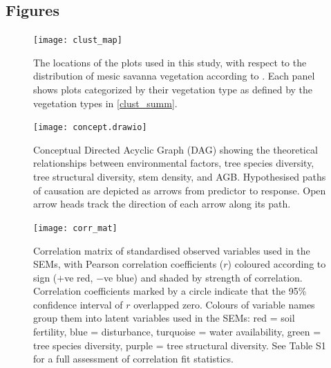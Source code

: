 \documentclass[12pt,a4paper]{article}
\begin{document}


\begin{landscape}
\section{Figures}
\begin{figure}[H]
\centering
	\texttt{[image: clust\_map]}
	\caption{The locations of the \nplots{} plots used in this study, with respect to the distribution of mesic savanna vegetation according to \citet{White1987}. Each panel shows plots categorized by their vegetation type as defined by the vegetation types in \autoref{clust_summ}.}
	\label{clust_map}
\end{figure}
\end{landscape}
\newpage{}

\begin{figure}[H]
\centering
\texttt{[image: concept.drawio]}
	\caption{Conceptual Directed Acyclic Graph (DAG) showing the theoretical relationships between environmental factors, tree species diversity, tree structural diversity, stem density, and AGB. Hypothesised paths of causation are depicted as arrows from predictor to response. Open arrow heads track the direction of each arrow along its path.}
	\label{con_mod}
\end{figure}
\newpage{}

\begin{figure}[H]
\centering
	\texttt{[image: corr\_mat]}
	\caption{Correlation matrix of standardised observed variables used in the SEMs, with Pearson correlation coefficients ($r$) coloured according to sign ($+$ve red, $-$ve blue) and shaded by strength of correlation. Correlation coefficients marked by a circle indicate that the 95\% confidence interval of $r$ overlapped zero. Colours of variable names group them into latent variables used in the SEMs: red = soil fertility, blue = disturbance, turquoise = water availability, green = tree species diversity, purple = tree structural diversity. See Table S1 for a full assessment of correlation fit statistics.}
	\label{corr_mat}
\end{figure}
\newpage{}
\end{document}
